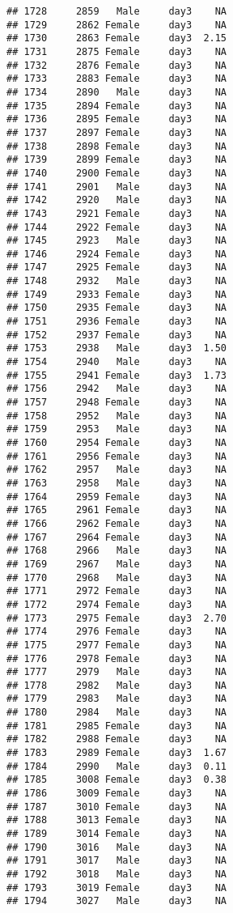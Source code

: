 \documentclass[
]{article}
\begin{document}
\begin{verbatim}
## 1728     2859   Male     day3    NA
## 1729     2862 Female     day3    NA
## 1730     2863 Female     day3  2.15
## 1731     2875 Female     day3    NA
## 1732     2876 Female     day3    NA
## 1733     2883 Female     day3    NA
## 1734     2890   Male     day3    NA
## 1735     2894 Female     day3    NA
## 1736     2895 Female     day3    NA
## 1737     2897 Female     day3    NA
## 1738     2898 Female     day3    NA
## 1739     2899 Female     day3    NA
## 1740     2900 Female     day3    NA
## 1741     2901   Male     day3    NA
## 1742     2920   Male     day3    NA
## 1743     2921 Female     day3    NA
## 1744     2922 Female     day3    NA
## 1745     2923   Male     day3    NA
## 1746     2924 Female     day3    NA
## 1747     2925 Female     day3    NA
## 1748     2932   Male     day3    NA
## 1749     2933 Female     day3    NA
## 1750     2935 Female     day3    NA
## 1751     2936 Female     day3    NA
## 1752     2937 Female     day3    NA
## 1753     2938   Male     day3  1.50
## 1754     2940   Male     day3    NA
## 1755     2941 Female     day3  1.73
## 1756     2942   Male     day3    NA
## 1757     2948 Female     day3    NA
## 1758     2952   Male     day3    NA
## 1759     2953   Male     day3    NA
## 1760     2954 Female     day3    NA
## 1761     2956 Female     day3    NA
## 1762     2957   Male     day3    NA
## 1763     2958   Male     day3    NA
## 1764     2959 Female     day3    NA
## 1765     2961 Female     day3    NA
## 1766     2962 Female     day3    NA
## 1767     2964 Female     day3    NA
## 1768     2966   Male     day3    NA
## 1769     2967   Male     day3    NA
## 1770     2968   Male     day3    NA
## 1771     2972 Female     day3    NA
## 1772     2974 Female     day3    NA
## 1773     2975 Female     day3  2.70
## 1774     2976 Female     day3    NA
## 1775     2977 Female     day3    NA
## 1776     2978 Female     day3    NA
## 1777     2979   Male     day3    NA
## 1778     2982   Male     day3    NA
## 1779     2983   Male     day3    NA
## 1780     2984   Male     day3    NA
## 1781     2985 Female     day3    NA
## 1782     2988 Female     day3    NA
## 1783     2989 Female     day3  1.67
## 1784     2990   Male     day3  0.11
## 1785     3008 Female     day3  0.38
## 1786     3009 Female     day3    NA
## 1787     3010 Female     day3    NA
## 1788     3013 Female     day3    NA
## 1789     3014 Female     day3    NA
## 1790     3016   Male     day3    NA
## 1791     3017   Male     day3    NA
## 1792     3018   Male     day3    NA
## 1793     3019 Female     day3    NA
## 1794     3027   Male     day3    NA

\end{verbatim}
\end{document}
